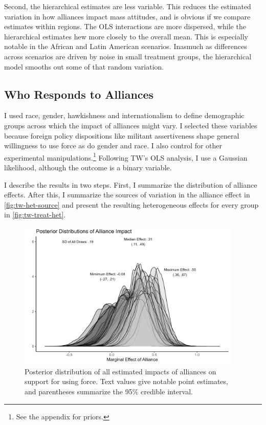 \documentclass[12pt]{article}
\begin{document}
Second, the hierarchical estimates are less variable. 
This reduces the estimated variation in how alliances impact mass attitudes, and is obvious if we compare estimates within regions. 
The OLS interactions are more dispersed, while the hierarchical estimates hew more closely to the overall mean.
This is especially notable in the African and Latin American scenarios. 
Inasmuch as differences across scenarios are driven by noise in small treatment groups, the hierarchical model smooths out some of that random variation.



\subsection{Who Responds to Alliances}

I used race, gender, hawkishness and internationalism to define demographic groups across which the impact of alliances might vary. 
I selected these variables because foreign policy dispositions like militant assertiveness shape general willingness to use force \citep{Kertzeretal2014} as do gender \citep{Barnhartetal2020} and race. 
I also control for other experimental manipulations.\footnote{See the appendix for priors.} 
Following TW's OLS analysis, I use a Gaussian likelihood, although the outcome is a binary variable. 


I describe the results in two steps. 
First, I summarize the distribution of alliance effects. 
After this, I summarize the sources of variation in the alliance effect in \autoref{fig:tw-het-source} and present the resulting heterogeneous effects for every group in \autoref{fig:tw-treat-het}.

\begin{figure}[htpb]
	\centering
		\includegraphics[width=0.95\textwidth]{../figures/tw-treat-het-sum.png}
	\caption{Posterior distribution of all estimated impacts of alliances on support for using force. Text values give notable point estimates, and parentheses summarize the 95\% credible interval.}
	\label{fig:tw-treat-het-sum}
\end{figure}
\end{document}

